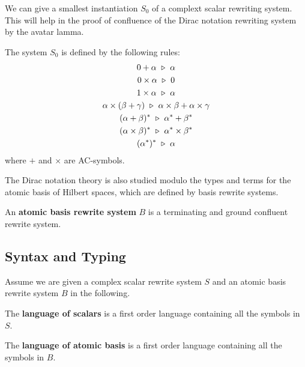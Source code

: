 We can give a smallest instantiation $S_0$ of a complext scalar rewriting system. This will help in the proof of confluence of the Dirac notation rewriting system by the avatar lamma.

\begin{definition}
  The system $S_0$ is defined by the following rules:
  \begin{gather*}
    0 + \alpha \ \triangleright\  \alpha\\
    0 \times \alpha \ \triangleright\  0\\
    1 \times \alpha \ \triangleright\  \alpha\\
    \alpha \times (\beta + \gamma) \ \triangleright\  \alpha \times \beta + \alpha \times \gamma\\
    (\alpha + \beta)^* \ \triangleright\  \alpha^* + \beta^*\\
    (\alpha \times \beta)^* \ \triangleright\  \alpha^* \times \beta^*\\
    (\alpha^*)^* \ \triangleright\  \alpha
  \end{gather*}
  where $+$ and $\times$ are AC-symbols.
\end{definition}

The Dirac notation theory is also studied modulo the types and terms for the atomic basis of Hilbert spaces, which are defined by basis rewrite systems.

\begin{definition}
  An \textbf{atomic basis rewrite system} $B$ is a terminating and ground confluent rewrite system.
\end{definition}

\subsection{Syntax and Typing}

Assume we are given a complex scalar rewrite system $S$ and an atomic basis rewrite system $B$ in the following.

\begin{definition}
  The \textbf{language of scalars} is a first order language containing all the symbols in $S$.
\end{definition}


\begin{definition}
  The \textbf{language of atomic basis} is a first order language containing all the symbols in $B$.
\end{definition}


